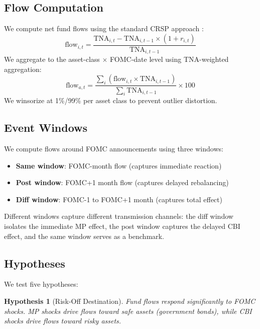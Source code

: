 \documentclass[11pt,a4paper]{article}
\newtheorem{hypothesis}{Hypothesis}
\begin{document}
\subsection{Flow Computation}

We compute net fund flows using the standard CRSP approach \citep{chevalier1997risk}:
\begin{equation}
\text{flow}_{i,t} = \frac{\text{TNA}_{i,t} - \text{TNA}_{i,t-1} \times (1 + r_{i,t})}{\text{TNA}_{i,t-1}}
\end{equation}
We aggregate to the asset-class $\times$ FOMC-date level using TNA-weighted aggregation:
\begin{equation}
\text{flow}_{a,t} = \frac{\sum_i (\text{flow}_{i,t} \times \text{TNA}_{i,t-1})}{\sum_i \text{TNA}_{i,t-1}} \times 100
\end{equation}
We winsorize at 1\%/99\% per asset class to prevent outlier distortion.

\subsection{Event Windows}

We compute flows around FOMC announcements using three windows:
\begin{itemize}[noitemsep]
    \item \textbf{Same window}: FOMC-month flow (captures immediate reaction)
    \item \textbf{Post window}: FOMC+1 month flow (captures delayed rebalancing)
    \item \textbf{Diff window}: FOMC-1 to FOMC+1 month (captures total effect)
\end{itemize}

Different windows capture different transmission channels: the diff window isolates the immediate MP effect, the post window captures the delayed CBI effect, and the same window serves as a benchmark.

\subsection{Hypotheses}

We test five hypotheses:

\begin{hypothesis}[Risk-Off Destination]
\label{hyp:h1}
Fund flows respond significantly to FOMC shocks. MP shocks drive flows toward safe assets (government bonds), while CBI shocks drive flows toward risky assets.
\end{hypothesis}
\end{document}
